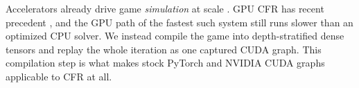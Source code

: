 Accelerators already drive game \emph{simulation} at scale \cite{koyamada2023pgx}.
GPU CFR has recent precedent
\cite{kim2026parallelizing,DBLP:journals/corr/abs-2508-06559}, and the GPU path of
the fastest such system still runs slower than an optimized CPU solver. We instead compile
the game into depth-stratified dense tensors and replay the whole iteration as one
captured CUDA graph. This compilation step is what makes stock PyTorch
\cite{paszke2019pytorch} and NVIDIA CUDA graphs \cite{guide2020cuda} applicable to
CFR at all.
